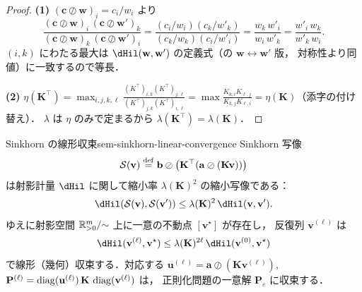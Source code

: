 \begin{proof}
  \textbf{(1)} $(\mathbf{c}\oslash\mathbf{w})_i = c_i / w_i$ より
  \[
    \frac{(\mathbf{c}\oslash\mathbf{w})_i\,(\mathbf{c}\oslash\mathbf{w}')_k}
         {(\mathbf{c}\oslash\mathbf{w})_k\,(\mathbf{c}\oslash\mathbf{w}')_i}
    = \frac{(c_i/w_i)(c_k/w'_k)}{(c_k/w_k)(c_i/w'_i)}
    = \frac{w_k\, w'_i}{w_i\, w'_k}
    = \frac{w'_i\, w_k}{w'_k\, w_i}.
  \]
  $(i,k)$ にわたる最大は $\dHil(\mathbf{w}, \mathbf{w}')$ の定義式（の $\mathbf{w}\leftrightarrow\mathbf{w}'$ 版，
  対称性より同値）に一致するので等長．

  \textbf{(2)} $\eta(\mathbf{K}^\top) = \max_{i,j,k,\ell}\frac{(K^\top)_{i,k}(K^\top)_{j,\ell}}{(K^\top)_{j,k}(K^\top)_{i,\ell}}
  = \max\frac{K_{k,i}K_{\ell,j}}{K_{k,j}K_{\ell,i}} = \eta(\mathbf{K})$（添字の付け替え）．
  $\lambda$ は $\eta$ のみで定まるから $\lambda(\mathbf{K}^\top) = \lambda(\mathbf{K})$．
\end{proof}

\begin{theorem}{Sinkhorn の線形収束}{sem-sinkhorn-linear-convergence}
  Sinkhorn 写像
  \[
    \mathcal{S}(\mathbf{v}) \overset{\mathrm{def}}{=}
    \mathbf{b} \oslash \bigl(\mathbf{K}^\top(\mathbf{a}\oslash(\mathbf{K}\mathbf{v}))\bigr)
  \]
  は射影計量 $\dHil$ に関して縮小率 $\lambda(\mathbf{K})^2$ の縮小写像である：
  \[
    \dHil(\mathcal{S}(\mathbf{v}), \mathcal{S}(\mathbf{v}'))
    \leq \lambda(\mathbf{K})^2\, \dHil(\mathbf{v}, \mathbf{v}').
  \]
  ゆえに射影空間 $\mathbb{R}_{>0}^m/{\sim}$ 上に一意の不動点 $[\mathbf{v}^\star]$ が存在し，
  反復列 $\mathbf{v}^{(\ell)}$ は
  \[
    \dHil(\mathbf{v}^{(\ell)}, \mathbf{v}^\star)
    \leq \lambda(\mathbf{K})^{2\ell}\, \dHil(\mathbf{v}^{(0)}, \mathbf{v}^\star)
  \]
  で線形（幾何）収束する．対応する $\mathbf{u}^{(\ell)} = \mathbf{a}\oslash(\mathbf{K}\mathbf{v}^{(\ell)})$,
  $\mathbf{P}^{(\ell)} = \operatorname{diag}(\mathbf{u}^{(\ell)})\,\mathbf{K}\,\operatorname{diag}(\mathbf{v}^{(\ell)})$ は，
  正則化問題の一意解 $\mathbf{P}_\varepsilon$ に収束する．
\end{theorem}

